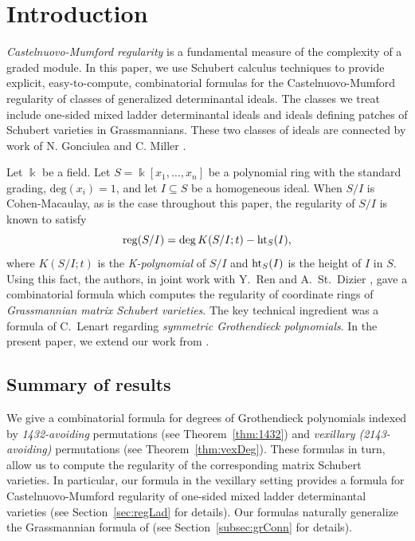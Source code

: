\documentclass[12pt]{amsart}
\theoremstyle{definition}
\theoremstyle{remark}
\numberwithin{equation}{section}
\newcommand{\reg}{{\rm reg}}
\begin{document}
\section{Introduction}
\label{sec:intro}
\emph{Castelnuovo-Mumford regularity} is a fundamental measure of the complexity of a graded module. 
In this paper, we use Schubert calculus techniques to provide explicit, easy-to-compute, combinatorial formulas for the Castelnuovo-Mumford regularity of  classes of generalized determinantal ideals.  The classes we treat include one-sided mixed ladder determinantal ideals and ideals defining patches of Schubert varieties in Grassmannians. These two classes of ideals are connected by work of  N. Gonciulea and C. Miller \cite{GM}.

Let $\Bbbk$ be a field. Let $S = \Bbbk[x_1,\dots, x_n]$ be a polynomial ring with the standard grading, $\text{deg}(x_i) = 1$, and let  $I\subseteq S$ be a homogeneous ideal. 
When $S/I$ is Cohen-Macaulay, as is the case throughout this paper, the regularity of $S/I$ is known to satisfy 
\begin{equation}\label{eq:regFormula}
    \reg(S/I)=\deg  K(S/I;t)-{\rm ht}_S(I),
\end{equation}
 where $K(S/I;t)$ is the \emph{K-polynomial} of $S/I$ and ${\rm ht}_S(I)$ is the height of $I$ in $S$.  Using this fact, the authors, in joint work with Y.~Ren and A.~St.~Dizier \cite{RRRSW}, gave a combinatorial formula which computes the regularity of coordinate rings of \emph{Grassmannian matrix Schubert varieties}.  The key technical ingredient was a  formula of C.~Lenart \cite{Le00} regarding \emph{symmetric Grothendieck polynomials}. In the present paper, we extend our work from \cite{RRRSW}. 


\subsection{Summary of results}
  We give a combinatorial formula for degrees of Grothendieck polynomials indexed by \emph{1432-avoiding} permutations (see Theorem~\ref{thm:1432}) and \emph{vexillary (2143-avoiding)} permutations (see Theorem~\ref{thm:vexDeg}).  
These formulas in turn, allow us to compute the regularity of the corresponding matrix Schubert varieties.  In particular, our formula in the vexillary setting provides a formula for Castelnuovo-Mumford regularity of  one-sided mixed ladder determinantal varieties (see Section~\ref{sec:regLad} for details).  Our formulas naturally generalize the Grassmannian formula of \cite{RRRSW} (see Section~\ref{subsec:grConn} for details).
\end{document}
